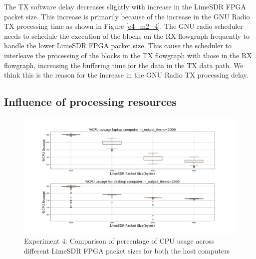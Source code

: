 The TX software delay decreases slightly with increase in the LimeSDR FPGA packet size.
This increase is primarily because of the increase in the GNU Radio TX processing time as shown in Figure \ref{e4_m2_4}.
The GNU radio scheduler needs to schedule the execution of the blocks on the RX flowgraph frequently to handle the lower LimeSDR FPGA packet size.
This cause the scheduler to interleave the processing of the blocks in the TX flowgraph with those in the RX flowgraph, increasing the buffering time for the data in the TX data path.
We think this is the reason for the increase in the GNU Radio TX processing delay.\\


\subsection{Influence of processing resources}
\begin{figure}[h!]
\centering
\includegraphics[width=\textwidth]{Thesis/Figure/E4_CPU.png}
\caption{Experiment 4: Comparison of percentage of CPU usage across different LimeSDR FPGA packet sizes for both the host computers}
\label{e4_cpu}
\end{figure}

